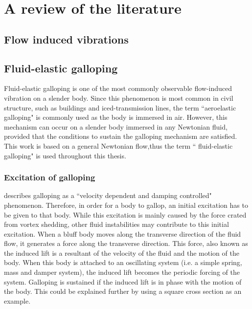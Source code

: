 \chapter{A review of the literature}

\section{Flow induced vibrations}
\label{sec:flow induced vibrations}


\section{Fluid-elastic galloping}
\label{fluid-elastic galloping}

Fluid-elastic galloping is one of the most commonly observable flow-induced vibration on a slender body. Since this phenomenon is most common in civil structure, such as buildings and iced-transmission lines, the term ``aeroelastic galloping" is commonly used as the body is immersed in air. However, this mechanism can occur on a slender body immersed in any Newtonian fluid, provided that the conditions to sustain the galloping mechanism are satisfied. This work is based on a general Newtonian flow,thus the term `` fluid-elastic galloping" is used throughout this thesis.
   

\subsection{Excitation of galloping}
\label{sec:exci-galloping}

\citet{Paidoussis2010} describes galloping as a ``velocity dependent and damping controlled" phenomenon. Therefore, in order for a body to gallop, an initial excitation has to be given to that body. While this excitation is mainly caused by the force crated from vortex shedding, other fluid instabilities may contribute to this initial excitation.  When a bluff body moves along the transverse direction of the fluid flow, it generates a force along the transverse direction. This force, also known as the induced lift is a resultant of the velocity of the fluid and the motion of the body. When this body is attached to an oscillating system (i.e. a simple spring, mass and damper system), the induced lift becomes the periodic forcing of the system. Galloping is sustained  if the induced lift is in phase with the motion of the body. This could be explained further by using a square cross section as an example.

